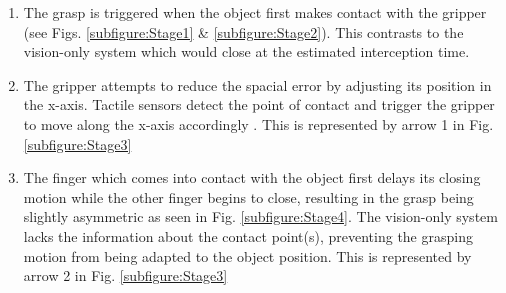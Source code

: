 \begin{enumerate}
    \item The grasp is triggered when the object first makes contact with the gripper (see Figs. \ref{subfigure:Stage1} \& \ref{subfigure:Stage2}). This contrasts to the vision-only system which would close at the estimated interception time.
    \item The gripper attempts to reduce the spacial error by adjusting its position in the x-axis. Tactile sensors detect the point of contact and trigger the gripper to move along the x-axis accordingly . This is represented by arrow 1 in Fig. \ref{subfigure:Stage3}
    \item The finger which comes into contact with the object first delays its closing motion while the other finger begins to close, resulting in the grasp being slightly asymmetric as seen in Fig. \ref{subfigure:Stage4}. The vision-only system lacks the information about the contact point(s), preventing the grasping motion from being adapted to the object position. This is represented by arrow 2 in Fig. \ref{subfigure:Stage3}
\end{enumerate}

